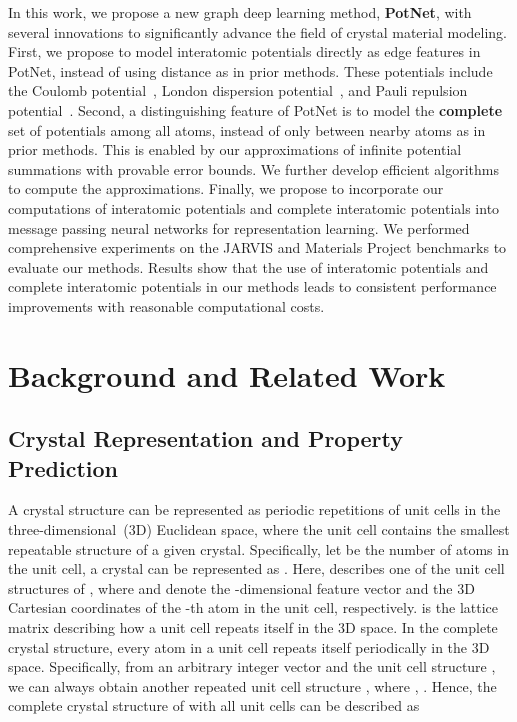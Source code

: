 \documentclass[nohyperref]{article}
\theoremstyle{plain}
\theoremstyle{definition}
\theoremstyle{remark}
\begin{document}
In this work, we propose a new graph deep learning method, \textbf{PotNet}, with several innovations to significantly advance the field of crystal material modeling. First, we propose to model interatomic potentials directly as edge features in PotNet, instead of using distance as in prior methods. These potentials include the Coulomb potential~\citep{west}, London dispersion potential~\citep{london}, and Pauli repulsion potential~\citep{pauli}. Second, a distinguishing feature of PotNet is to model the \textbf{complete} set of potentials among all atoms, instead of only between nearby atoms as in prior methods. This is enabled by our approximations of infinite potential summations with provable error bounds. We further develop efficient algorithms to compute the approximations. Finally, we propose to incorporate our computations of interatomic potentials and complete interatomic potentials into message passing neural networks for representation learning. We performed comprehensive experiments on the JARVIS and Materials Project benchmarks to evaluate our methods. Results show that the use of interatomic potentials and complete interatomic potentials in our methods leads to consistent performance improvements with reasonable computational costs.



\section{Background and Related Work}
\label{background}


\subsection{Crystal Representation and Property Prediction}
\label{crystal}

A crystal structure can be represented as periodic repetitions of unit cells in the three-dimensional~(3D) Euclidean space, where the unit cell contains the smallest repeatable structure of a given crystal. Specifically, let  be the number of atoms in the unit cell, a crystal can be represented as . Here,  describes one of the unit cell structures of , where  and  denote the -dimensional feature vector and the 3D Cartesian coordinates of the -th atom in the unit cell, respectively.  is the lattice matrix describing how a unit cell repeats itself in the 3D space. In the complete crystal structure, every atom in a unit cell repeats itself periodically in the 3D space. Specifically, from an arbitrary integer vector  and the unit cell structure , we can always obtain another repeated unit cell structure , where , . Hence, the complete crystal structure  of  with all unit cells can be described as 
\end{document}
